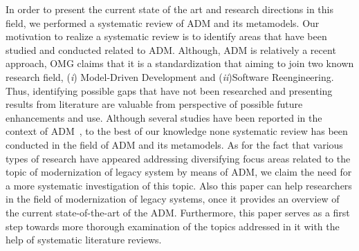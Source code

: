 In order to  present the current state of the art and research directions in this field, we performed a systematic review of ADM and its metamodels. Our motivation to realize a systematic review is to identify areas that have been studied and conducted related to ADM. Although, ADM is relatively a recent approach, OMG claims that it is a standardization that aiming to join two known research field, (\textit{i}) Model-Driven Development and (\textit{ii})Software Reengineering. Thus, identifying possible gaps that have not been researched and presenting results from literature are valuable from perspective of possible future enhancements and use.  Although several studies have been reported in the context of ADM~\cite{PerezCastillo20121370, SMR:SMR582, FuentesFernandez2012247, PrezCastillo2011519}, to the best of our knowledge none systematic review has been conducted in the field of ADM and its metamodels. As for the fact that various types of research have appeared addressing diversifying focus areas related to the topic of modernization of legacy system by means of ADM, we claim the need for a more systematic investigation of this topic. Also this paper can help researchers in the field of modernization of legacy systems, once it provides an overview of the current state-of-the-art of the ADM. Furthermore, this paper serves as a first step towards more thorough examination of the topics addressed in it with the help of systematic literature reviews.






